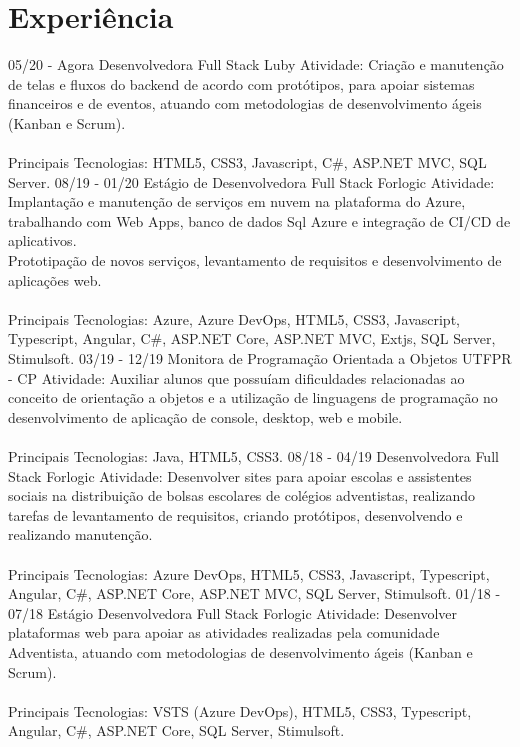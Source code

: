 \documentclass[]{friggeri-cv}
\begin{document}
\section{Experiência}
\begin{entrylist}
    \entry
    {05/20 - Agora}
    {Desenvolvedora Full Stack}
    {Luby}
    {Atividade: Criação e manutenção de telas e fluxos do backend de acordo com protótipos, para apoiar sistemas financeiros e de eventos, atuando com metodologias de desenvolvimento ágeis (Kanban e Scrum).\\\\
    Principais Tecnologias: HTML5, CSS3, Javascript, C\#, ASP.NET MVC, SQL Server.}
    \entry
    {08/19 - 01/20}
    {Estágio de Desenvolvedora Full Stack}
    {Forlogic}
    {Atividade: Implantação e manutenção de serviços em nuvem na plataforma do Azure, trabalhando com Web Apps, banco de dados Sql Azure e integração de CI/CD de aplicativos.\\
    Prototipação de novos serviços, levantamento de requisitos e desenvolvimento de aplicações web.\\\\
    Principais Tecnologias: Azure, Azure DevOps, HTML5, CSS3, Javascript, Typescript, Angular, C\#, ASP.NET Core, ASP.NET MVC, Extjs, SQL Server, Stimulsoft.}
    \entry
    {03/19 - 12/19}
    {Monitora de Programação Orientada a Objetos}
    {UTFPR - CP}
    {Atividade: Auxiliar alunos que possuíam dificuldades relacionadas ao conceito de orientação a objetos e a utilização de linguagens de programação no desenvolvimento de aplicação de console, desktop, web e mobile.\\\\
    Principais Tecnologias: Java, HTML5, CSS3.}
    \entry
    {08/18 - 04/19}
    {Desenvolvedora Full Stack}
    {Forlogic}
    {Atividade: Desenvolver sites para apoiar escolas e assistentes sociais na distribuição de bolsas escolares de colégios adventistas, realizando tarefas de levantamento de requisitos, criando protótipos, desenvolvendo e realizando manutenção.
    \\\\
    Principais Tecnologias: Azure DevOps, HTML5, CSS3, Javascript, Typescript, Angular, C\#, ASP.NET Core, ASP.NET MVC, SQL Server, Stimulsoft.}
    \entry
    {01/18 - 07/18}
    {Estágio Desenvolvedora Full Stack}
    {Forlogic}
    {Atividade: Desenvolver plataformas web para apoiar as atividades realizadas pela comunidade Adventista, atuando com metodologias de desenvolvimento ágeis (Kanban e Scrum).\\\\
    Principais Tecnologias: VSTS (Azure DevOps), HTML5, CSS3, Typescript, Angular, C\#, ASP.NET Core, SQL Server, Stimulsoft.}
\end{entrylist}
\end{document}
